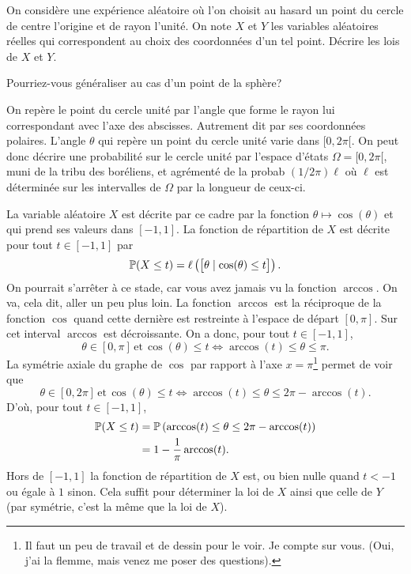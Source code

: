 \documentclass[11pt, a4paper]{article}
\begin{document}
\begin{question}
  On considère une expérience aléatoire où l'on choisit au hasard un
  point du cercle de centre l'origine et de rayon l'unité. On note $X$
  et $Y$ les variables aléatoires réelles qui correspondent au choix
  des coordonnées d'un tel point. Décrire les lois de $X$ et $Y$.

  \noindent Pourriez-vous généraliser au cas d'un point de la sphère?
\end{question}

\begin{solution}
  On repère le point du cercle unité par l'angle que forme le rayon
  lui correspondant avec l'axe des abscisses. Autrement dit par ses
  coordonnées polaires. L'angle $\theta$ qui repère un point du cercle
  unité varie dans $[0, 2\pi[$. On peut donc décrire une probabilité
  sur le cercle unité par l'espace d'états $\Omega = [0, 2\pi[$, muni
  de la tribu des boréliens, et agrémenté de la probab $(1/2\pi)\ell$
  où $\ell$ est déterminée sur les intervalles de $\Omega$ par la
  longueur de ceux-ci.

  \noindent La variable aléatoire $X$ est décrite par ce cadre par la
  fonction $\theta \mapsto \cos(\theta)$ et qui prend ses valeurs dans
  $[-1, 1]$. La fonction de répartition de $X$ est décrite pour tout
  $t \in [-1, 1]$ par
  \[
  \mathbb{P}(X \leq t) = \ell\left(\big[\theta \mid \cos(\theta) \leq
    t\big]\right).
  \]
  On pourrait s'arrêter à ce stade, car vous avez jamais vu la
  fonction $\arccos$. On va, cela dit, aller un peu plus loin. La
  fonction $\arccos$ est la réciproque de la fonction $\cos$ quand
  cette dernière est restreinte à l'espace de départ $[0, \pi]$. Sur
  cet interval $\arccos$ est décroissante. On a donc, pour tout
  $t \in [-1, 1]$,
  \[
  \theta \in [0, \pi] \, \textrm{et} \, \cos(\theta) \leq t
  \Longleftrightarrow \arccos(t) \leq \theta \leq \pi.
  \]
  La symétrie axiale du graphe de $\cos$ par rapport à l'axe
  $x = \pi$\footnote{Il faut un peu de travail et de dessin pour le
    voir. Je compte sur vous. (Oui, j'ai la flemme, mais venez me
    poser des questions).} permet de voir que
  \[
  \theta \in [0, 2\pi] \, \textrm{et} \, \cos(\theta) \leq t
  \Longleftrightarrow \arccos(t) \leq \theta \leq 2\pi - \arccos(t).
  \]
  D'où, pour tout $t \in [-1, 1]$,
  \begin{align*}
    \mathbb{P}(X \leq t) & = \mathbb{P}\left(\arccos(t) \leq \theta \leq 2\pi - \arccos(t)\right) \\
                      &  = 1 - \frac{1}{\pi}\arccos(t).
  \end{align*}
  Hors de $[-1, 1]$ la fonction de répartition de $X$ est, ou bien
  nulle quand $t < -1$ ou égale à $1$ sinon. Cela suffit pour
  déterminer la loi de $X$ ainsi que celle de $Y$ (par symétrie, c'est
  la même que la loi de $X$).


\end{solution}
\end{document}
